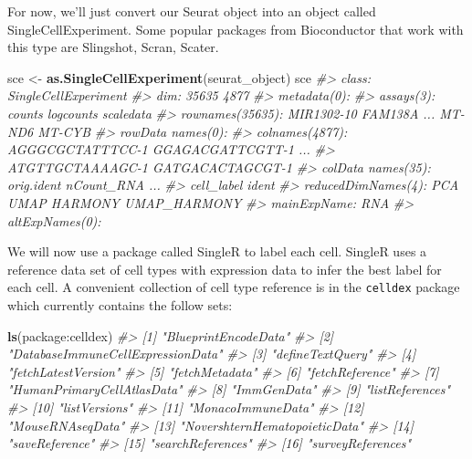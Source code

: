 \documentclass[
]{book}
\newenvironment{Shaded}{\begin{snugshade}}{\end{snugshade}}
\newcommand{\CommentTok}[1]{\textcolor[rgb]{0.56,0.35,0.01}{\textit{#1}}}
\newcommand{\FunctionTok}[1]{\textcolor[rgb]{0.13,0.29,0.53}{\textbf{#1}}}
\newcommand{\NormalTok}[1]{#1}
\newcommand{\OtherTok}[1]{\textcolor[rgb]{0.56,0.35,0.01}{#1}}
\newcommand{\StringTok}[1]{\textcolor[rgb]{0.31,0.60,0.02}{#1}}
\begin{document}
For now, we'll just convert our Seurat object into an object called SingleCellExperiment. Some popular packages from Bioconductor that work with this type are Slingshot, Scran, Scater.

\begin{Shaded}
\begin{Highlighting}[]
\NormalTok{sce }\OtherTok{\textless{}{-}} \FunctionTok{as.SingleCellExperiment}\NormalTok{(seurat\_object)}
\NormalTok{sce}
\CommentTok{\#\textgreater{} class: SingleCellExperiment }
\CommentTok{\#\textgreater{} dim: 35635 4877 }
\CommentTok{\#\textgreater{} metadata(0):}
\CommentTok{\#\textgreater{} assays(3): counts logcounts scaledata}
\CommentTok{\#\textgreater{} rownames(35635): MIR1302{-}10 FAM138A ... MT{-}ND6 MT{-}CYB}
\CommentTok{\#\textgreater{} rowData names(0):}
\CommentTok{\#\textgreater{} colnames(4877): AGGGCGCTATTTCC{-}1 GGAGACGATTCGTT{-}1 ...}
\CommentTok{\#\textgreater{}   ATGTTGCTAAAAGC{-}1 GATGACACTAGCGT{-}1}
\CommentTok{\#\textgreater{} colData names(35): orig.ident nCount\_RNA ...}
\CommentTok{\#\textgreater{}   cell\_label ident}
\CommentTok{\#\textgreater{} reducedDimNames(4): PCA UMAP HARMONY UMAP\_HARMONY}
\CommentTok{\#\textgreater{} mainExpName: RNA}
\CommentTok{\#\textgreater{} altExpNames(0):}
\end{Highlighting}
\end{Shaded}

We will now use a package called SingleR to label each cell. SingleR uses a reference data set of cell types with expression data to infer the best label for each cell. A convenient collection of cell type reference is in the \texttt{celldex} package which currently contains the follow sets:

\begin{Shaded}
\begin{Highlighting}[]
\FunctionTok{ls}\NormalTok{(}\StringTok{\textquotesingle{}package:celldex\textquotesingle{}}\NormalTok{)}
\CommentTok{\#\textgreater{}  [1] "BlueprintEncodeData"             }
\CommentTok{\#\textgreater{}  [2] "DatabaseImmuneCellExpressionData"}
\CommentTok{\#\textgreater{}  [3] "defineTextQuery"                 }
\CommentTok{\#\textgreater{}  [4] "fetchLatestVersion"              }
\CommentTok{\#\textgreater{}  [5] "fetchMetadata"                   }
\CommentTok{\#\textgreater{}  [6] "fetchReference"                  }
\CommentTok{\#\textgreater{}  [7] "HumanPrimaryCellAtlasData"       }
\CommentTok{\#\textgreater{}  [8] "ImmGenData"                      }
\CommentTok{\#\textgreater{}  [9] "listReferences"                  }
\CommentTok{\#\textgreater{} [10] "listVersions"                    }
\CommentTok{\#\textgreater{} [11] "MonacoImmuneData"                }
\CommentTok{\#\textgreater{} [12] "MouseRNAseqData"                 }
\CommentTok{\#\textgreater{} [13] "NovershternHematopoieticData"    }
\CommentTok{\#\textgreater{} [14] "saveReference"                   }
\CommentTok{\#\textgreater{} [15] "searchReferences"                }
\CommentTok{\#\textgreater{} [16] "surveyReferences"}
\end{Highlighting}
\end{Shaded}
\end{document}
